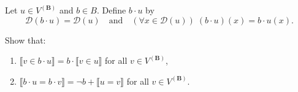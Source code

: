 Let $u \in V^{(\mathbf{B})}$ and $b \in B$. Define $b \cdot u$ by
$$\mathcal{D}(b \cdot u) = \mathcal{D}(u) \quad\text{and}\quad (\forall x \in \mathcal{D}(u))\; (b \cdot u)(x) = b \cdot u(x).$$

Show that:
\begin{enumerate}
\item $\llbracket v \in b \cdot u \rrbracket = b \cdot \llbracket v \in u \rrbracket$ for all $v \in V^{(\mathbf{B})}$,
\item $\llbracket b \cdot u = b \cdot v \rrbracket = \neg b + \llbracket u = v \rrbracket$ for all $v \in V^{(\mathbf{B})}$.
\end{enumerate}
